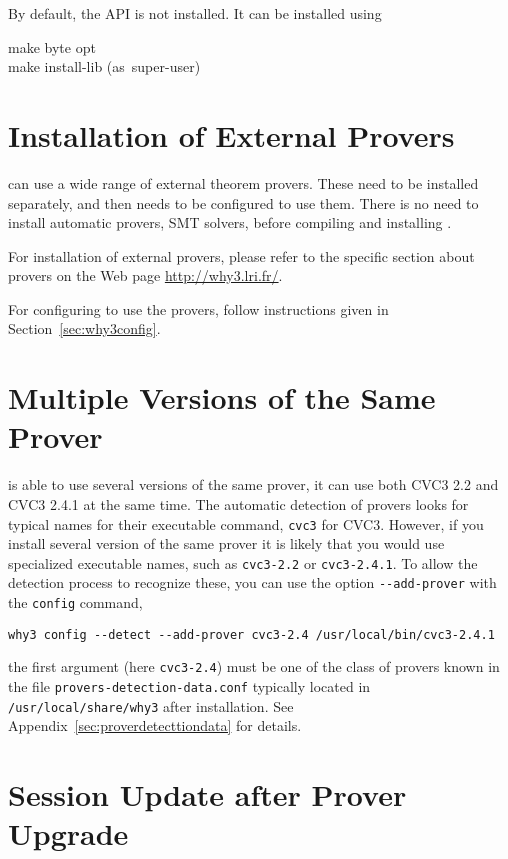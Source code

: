 By default, the \why API is not installed. It can be installed using
\begin{flushleft}\ttfamily
make byte opt \\
make install-lib \mbox{\rmfamily (as super-user)}
\end{flushleft}

\section{Installation of External Provers}
\label{provers}

\why can use a wide range of external theorem provers. These need to
be installed separately, and then \why needs to be configured to use
them. There is no need to install automatic provers, \eg SMT solvers,
before compiling and installing \why.

For installation of external provers, please refer to the specific
section about provers on the Web page \url{http://why3.lri.fr/}.

For configuring \why to use the provers, follow instructions given in
Section~\ref{sec:why3config}.

\section{Multiple Versions of the Same Prover}

\why is able to use several versions of the same
prover, \eg it can use both CVC3 2.2 and CVC3 2.4.1 at the same time.
The automatic detection of provers looks for typical names for their
executable command, \eg \texttt{cvc3} for CVC3. However, if you
install several version of the same prover it is likely that you would
use specialized executable names, such as \texttt{cvc3-2.2} or
\texttt{cvc3-2.4.1}. To allow the \why detection process to recognize
these, you can use the option \verb|--add-prover| with the
\texttt{config} command, \eg
{}
\begin{verbatim}
why3 config --detect --add-prover cvc3-2.4 /usr/local/bin/cvc3-2.4.1
\end{verbatim}
the first argument (here \verb|cvc3-2.4|) must be one of the class of
provers known in the file \verb|provers-detection-data.conf| typically
located in \verb|/usr/local/share/why3| after installation. See
Appendix~\ref{sec:proverdetecttiondata} for details.


\section{Session Update after Prover Upgrade}
\label{sec:uninstalledprovers}

